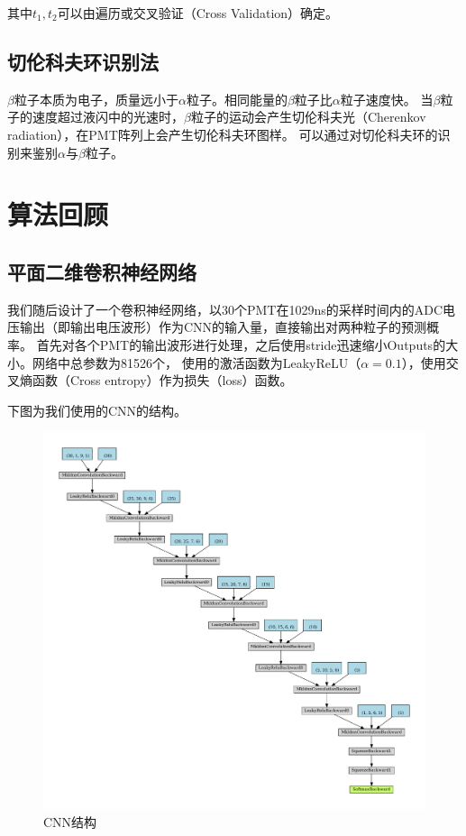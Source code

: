 \documentclass{ctexart}
\begin{document}
其中$t_{1},t_{2}$可以由遍历或交叉验证（Cross Validation）确定。

\subsection{切伦科夫环识别法}
$\beta$粒子本质为电子，质量远小于$\alpha$粒子。相同能量的$\beta$粒子比$\alpha$粒子速度快。
当$\beta$粒子的速度超过液闪中的光速时，$\beta$粒子的运动会产生切伦科夫光（Cherenkov radiation），在PMT阵列上会产生切伦科夫环图样。
可以通过对切伦科夫环的识别来鉴别$\alpha$与$\beta$粒子。

\section{算法回顾}
\subsection{平面二维卷积神经网络} %
\label{sub:平面二维卷积神经网络}
我们随后设计了一个卷积神经网络，以30个PMT在1029ns的采样时间内的ADC电压输出（即输出电压波形）作为CNN的输入量，直接输出对两种粒子的预测概率。
首先对各个PMT的输出波形进行处理，之后使用stride迅速缩小Outputs的大小。网络中总参数为81526个，
使用的激活函数为LeakyReLU（$\alpha=0.1$），使用交叉熵函数（Cross entropy）作为损失（loss）函数。


下图为我们使用的CNN的结构。

\begin{figure}[H]
    \centering
    \includegraphics[width=1.0\linewidth]{net.pdf}
    \caption{CNN结构}
\end{figure}
\end{document}
